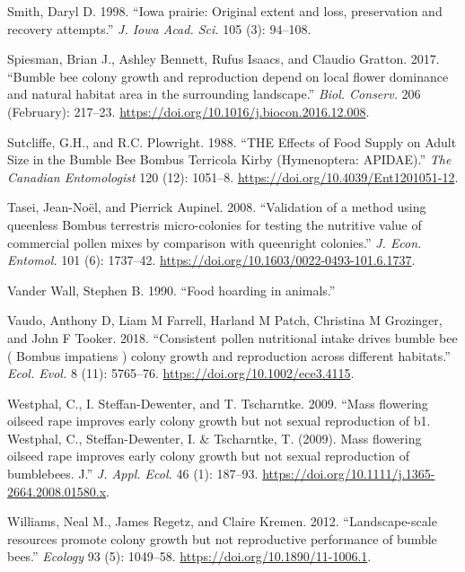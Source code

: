 \documentclass[11pt,]{article}
\begin{document}
\leavevmode\hypertarget{ref-Smith1998}{}%
Smith, Daryl D. 1998. ``Iowa prairie: Original extent and loss,
preservation and recovery attempts.'' \emph{J. Iowa Acad. Sci.} 105 (3):
94--108.

\leavevmode\hypertarget{ref-Spiesman2017}{}%
Spiesman, Brian J., Ashley Bennett, Rufus Isaacs, and Claudio Gratton.
2017. ``Bumble bee colony growth and reproduction depend on local flower
dominance and natural habitat area in the surrounding landscape.''
\emph{Biol. Conserv.} 206 (February): 217--23.
\url{https://doi.org/10.1016/j.biocon.2016.12.008}.

\leavevmode\hypertarget{ref-Sutcliffe1988}{}%
Sutcliffe, G.H., and R.C. Plowright. 1988. ``THE Effects of Food Supply
on Adult Size in the Bumble Bee Bombus Terricola Kirby (Hymenoptera:
APIDAE).'' \emph{The Canadian Entomologist} 120 (12): 1051--8.
\url{https://doi.org/10.4039/Ent1201051-12}.

\leavevmode\hypertarget{ref-Tasei2008}{}%
Tasei, Jean-Noël, and Pierrick Aupinel. 2008. ``Validation of a method
using queenless Bombus terrestris micro-colonies for testing the
nutritive value of commercial pollen mixes by comparison with queenright
colonies.'' \emph{J. Econ. Entomol.} 101 (6): 1737--42.
\url{https://doi.org/10.1603/0022-0493-101.6.1737}.

\leavevmode\hypertarget{ref-VanderWall1990}{}%
Vander Wall, Stephen B. 1990. ``Food hoarding in animals.''

\leavevmode\hypertarget{ref-Vaudo2018}{}%
Vaudo, Anthony D, Liam M Farrell, Harland M Patch, Christina M
Grozinger, and John F Tooker. 2018. ``Consistent pollen nutritional
intake drives bumble bee ( Bombus impatiens ) colony growth and
reproduction across different habitats.'' \emph{Ecol. Evol.} 8 (11):
5765--76. \url{https://doi.org/10.1002/ece3.4115}.

\leavevmode\hypertarget{ref-Westphal2009a}{}%
Westphal, C., I. Steffan-Dewenter, and T. Tscharntke. 2009. ``Mass
flowering oilseed rape improves early colony growth but not sexual
reproduction of b1. Westphal, C., Steffan-Dewenter, I. \& Tscharntke, T.
(2009). Mass flowering oilseed rape improves early colony growth but not
sexual reproduction of bumblebees. J.'' \emph{J. Appl. Ecol.} 46 (1):
187--93. \url{https://doi.org/10.1111/j.1365-2664.2008.01580.x}.

\leavevmode\hypertarget{ref-Williams2012b}{}%
Williams, Neal M., James Regetz, and Claire Kremen. 2012.
``Landscape-scale resources promote colony growth but not reproductive
performance of bumble bees.'' \emph{Ecology} 93 (5): 1049--58.
\url{https://doi.org/10.1890/11-1006.1}.
\end{document}
